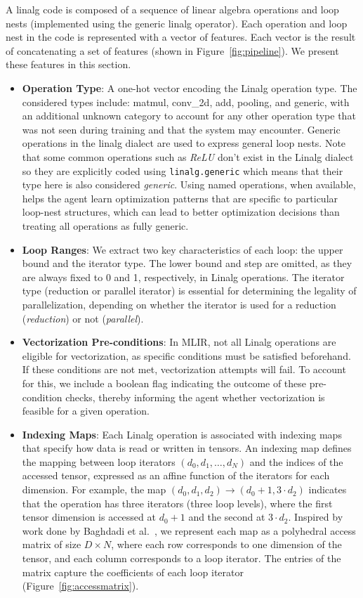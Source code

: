\documentclass[10pt,twocolumn]{article}
\begin{document}
A linalg code is composed of a sequence of linear algebra operations and loop nests (implemented using the generic linalg operator). Each operation and loop nest in the code is represented with a vector of features. Each vector is the result of concatenating a set of features (shown in Figure~\ref{fig:pipeline}). We present these features in this section.

\begin{itemize}
\item \textbf{Operation Type}: A one-hot vector encoding the Linalg operation type. The considered types include: matmul, conv\_2d, add, pooling, and generic, with an additional unknown category to account for any other operation type that was not seen during training and that the system may encounter. Generic operations in the linalg dialect are used to express general loop nests. Note that some common operations such as \emph{ReLU} don't exist in the Linalg dialect so they are explicitly coded using \texttt{linalg.generic} which means that their type here is also considered \emph{generic}. Using named operations, when available, helps the agent learn optimization patterns that are specific to particular loop-nest structures, which can lead to better optimization decisions than treating all operations as fully generic.
\item \textbf{Loop Ranges}: We extract two key characteristics of each loop: the upper bound and the iterator type. The lower bound and step are omitted, as they are always fixed to 0 and 1, respectively, in Linalg operations. The iterator type (reduction or parallel iterator) is essential for determining the legality of parallelization, depending on whether the iterator is used for a reduction (\emph{reduction}) or not (\emph{parallel}).
\item \textbf{Vectorization Pre-conditions}: In MLIR, not all Linalg operations are eligible for vectorization, as specific conditions must be satisfied beforehand. If these conditions are not met, vectorization attempts will fail. To account for this, we include a boolean flag indicating the outcome of these pre-condition checks, thereby informing the agent whether vectorization is feasible for a given operation.
\item \textbf{Indexing Maps}: Each Linalg operation is associated with indexing maps that specify how data is read or written in tensors. An indexing map defines the mapping between loop iterators $(d_0, d_1, \ldots, d_N)$ and the indices of the accessed tensor, expressed as an affine function of the iterators for each dimension. For example, the map $(d_0, d_1, d_2) \rightarrow (d_0 + 1, 3 \cdot d_2)$ indicates that the operation has three iterators (three loop levels), where the first tensor dimension is accessed at $d_0 + 1$ and the second at $3 \cdot d_2$. Inspired by work done by Baghdadi et al.~\cite{ref5}, we represent each map as a polyhedral access matrix of size $D \times N$, where each row corresponds to one dimension of the tensor, and each column corresponds to a loop iterator. The entries of the matrix capture the coefficients of each loop iterator (Figure~\ref{fig:accessmatrix}).

\end{itemize}
\end{document}
